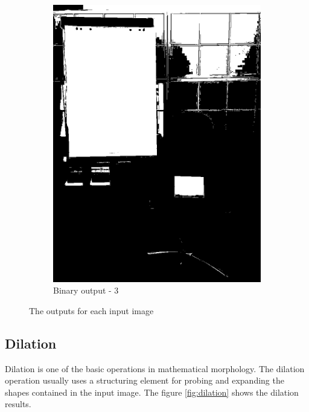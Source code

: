 \documentclass[paper=a4, fontsize=10pt]{scrartcl} %
\numberwithin{equation}{section} %
\numberwithin{figure}{section} %
\begin{document}
\begin{figure}
\begin{subfigure}[b]{0.35\textwidth}
		\includegraphics[width=\textwidth]{binary_03}
		\caption{Binary output - 3}
		\label{fig:binary_output_03}
	\end{subfigure}

	\caption{The outputs for each input image}
	\label{fig:thresholding}
\end{figure}

\subsection{Dilation}
Dilation is one of the basic operations in mathematical morphology. The dilation operation usually uses a structuring element for probing and expanding the shapes contained in the input image. The figure \ref{fig:dilation} shows the dilation results.
\end{document}
